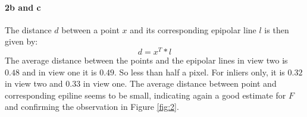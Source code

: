 \documentclass[11pt,a4paper]{article}
\begin{document}
\paragraph{2b and c}
The distance $d$ between a point $x$ and its corresponding epipolar line $l$ is then given by:
\begin{equation}
d=x^{T}*l
\end{equation}
The average distance between the points and the epipolar lines in view two is $0.48$ and in view one it is $0.49$. So less than half a pixel. For inliers only, it is $0.32$ in view two and $0.33$ in view one. The average distance between point and corresponding epiline seems to be small, indicating again a good estimate for $F$ and confirming the observation in Figure \ref{fig:2}.
\end{document}
